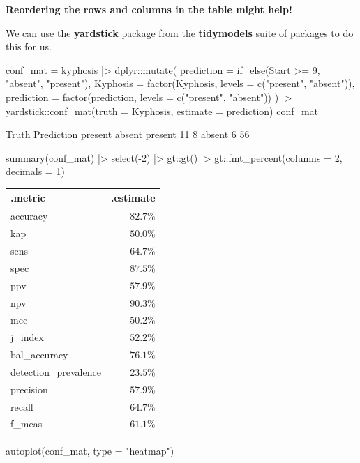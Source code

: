 \documentclass[a4paper]{article}
\begin{document}
\begin{greenbox}
	\textbf{Reordering the rows and columns in the table might help!}
\end{greenbox}
We can use the \textbf{yardstick} package from the \textbf{tidymodels} suite of packages to do this for us.
\begin{Schunk}
\begin{Sinput}
conf_mat = kyphosis |> 
  dplyr::mutate(
    prediction = if_else(Start >= 9, 
                         "absent", 
                         "present"),
    Kyphosis = factor(Kyphosis, levels = c("present", "absent")),
    prediction = factor(prediction, levels = c("present", "absent"))
  ) |> 
  yardstick::conf_mat(truth = Kyphosis, estimate = prediction)
conf_mat
\end{Sinput}
\begin{Soutput}
          Truth
Prediction present absent
   present      11      8
   absent        6     56
\end{Soutput}
\begin{Sinput}
summary(conf_mat) |> 
  select(-2) |> 
  gt::gt() |> 
  gt::fmt_percent(columns = 2,
                  decimals = 1)
\end{Sinput}
\begin{longtable}{lr}
\toprule
.metric & .estimate \\ 
\midrule\addlinespace[2.5pt]
accuracy & $82.7\%$ \\ 
kap & $50.0\%$ \\ 
sens & $64.7\%$ \\ 
spec & $87.5\%$ \\ 
ppv & $57.9\%$ \\ 
npv & $90.3\%$ \\ 
mcc & $50.2\%$ \\ 
j\_index & $52.2\%$ \\ 
bal\_accuracy & $76.1\%$ \\ 
detection\_prevalence & $23.5\%$ \\ 
precision & $57.9\%$ \\ 
recall & $64.7\%$ \\ 
f\_meas & $61.1\%$ \\ 
\bottomrule
\end{longtable}
\begin{Sinput}
autoplot(conf_mat, type = "heatmap")
\end{Sinput}



\end{Schunk}
\end{document}
